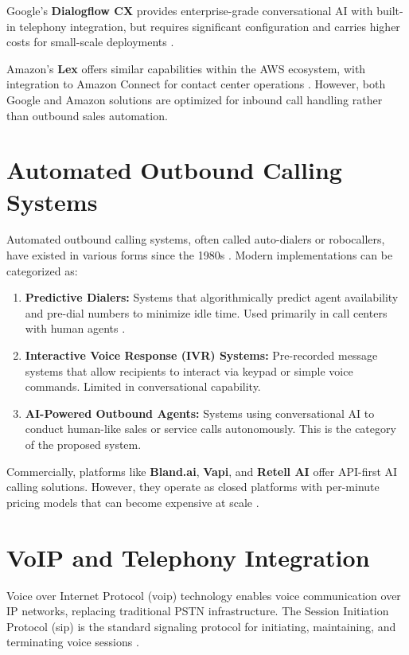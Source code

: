 \documentclass[12pt,a4paper,oneside]{book}
\begin{document}
Google's \textbf{Dialogflow CX} provides enterprise-grade conversational AI with built-in telephony integration, but requires significant configuration and carries higher costs for small-scale deployments \citep{google2023dialogflow}.

Amazon's \textbf{Lex} offers similar capabilities within the AWS ecosystem, with integration to Amazon Connect for contact center operations \citep{amazon2023lex}. However, both Google and Amazon solutions are optimized for inbound call handling rather than outbound sales automation.

\section{Automated Outbound Calling Systems}

Automated outbound calling systems, often called auto-dialers or robocallers, have existed in various forms since the 1980s \citep{mozer1998autodialer}. Modern implementations can be categorized as:

\begin{enumerate}
    \item \textbf{Predictive Dialers:} Systems that algorithmically predict agent availability and pre-dial numbers to minimize idle time. Used primarily in call centers with human agents \citep{samuelson2019predictive}.
    \item \textbf{Interactive Voice Response (IVR) Systems:} Pre-recorded message systems that allow recipients to interact via keypad or simple voice commands. Limited in conversational capability.
    \item \textbf{AI-Powered Outbound Agents:} Systems using conversational AI to conduct human-like sales or service calls autonomously. This is the category of the proposed system.
\end{enumerate}

Commercially, platforms like \textbf{Bland.ai}, \textbf{Vapi}, and \textbf{Retell AI} offer API-first AI calling solutions. However, they operate as closed platforms with per-minute pricing models that can become expensive at scale \citep{bland2024}.

\section{VoIP and Telephony Integration}

Voice over Internet Protocol (\gls{voip}) technology enables voice communication over IP networks, replacing traditional PSTN infrastructure. The Session Initiation Protocol (\gls{sip}) is the standard signaling protocol for initiating, maintaining, and terminating voice sessions \citep{rosenberg2002sip}.
\end{document}
